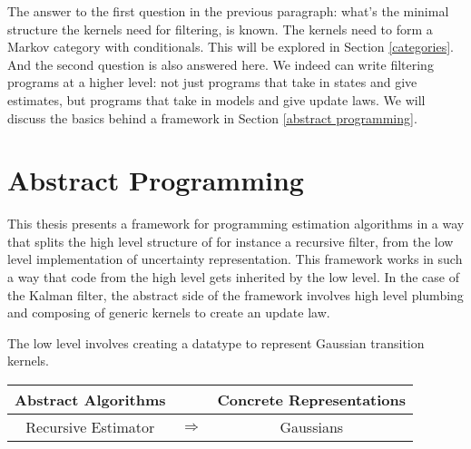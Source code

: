 The answer to the first question in the previous paragraph: what's the minimal structure the kernels need for filtering, is known. The kernels need to form a Markov category with conditionals. This will be explored in Section \ref{categories}. And the second question is also answered here. We indeed can write filtering programs at a higher level: not just programs that take in states and give estimates, but programs that take in models and give update laws. We will discuss the basics behind a framework in Section \ref{abstract programming}.

\section{Abstract Programming}

This thesis presents a framework for programming estimation algorithms in a way that splits the high level structure of for instance a recursive filter, from the low level implementation of uncertainty representation. This framework works in such a way that code from the high level gets inherited by the low level. In the case of the Kalman filter, the abstract side of the framework involves high level plumbing and composing of generic kernels to create an update law. 

The low level involves creating a datatype to represent Gaussian transition kernels. 

\begin{table}[]
    \centering
    \begin{tabular}{ccc}
	Abstract Algorithms &               & Concrete Representations \\ \hline
	Recursive Estimator & $\Rightarrow$ & Gaussians               
    \end{tabular}
\end{table}

